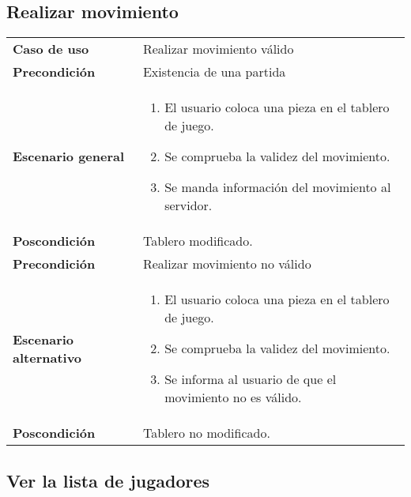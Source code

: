 \subsection{Realizar movimiento}
{\footnotesize
\begin{tabularx}{0.95\textwidth}{p{}|X}

\textbf{Caso de uso} & Realizar movimiento válido \\

\textbf{Precondición} & Existencia de una partida \\

\textbf{Escenario general} & \begin{enumerate}
\item El usuario coloca una pieza en el tablero de juego.
\item Se comprueba la validez del movimiento.
\item Se manda información del movimiento al servidor.

\end{enumerate} \\

\textbf{Poscondición} & Tablero modificado.\\

\textbf{Precondición} & Realizar movimiento no válido\\
\textbf{Escenario alternativo} & \begin{enumerate}
\item El usuario coloca una pieza en el tablero de juego.
\item Se comprueba la validez del movimiento.
\item Se informa al usuario de que el movimiento no es válido.

\end{enumerate} \\

\textbf{Poscondición} & Tablero no modificado.

\end{tabularx}
}

\subsection{Ver la lista de jugadores}

